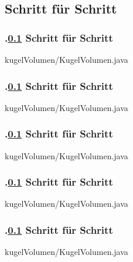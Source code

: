 \def\stitle{Schritt f\"ur Schritt}%
\subsection{\stitle}\label{S:Schritt f\"ur Schritt}
\begin{frame}[t]%
  \frametitle{\kap.\ref{S:Schritt f\"ur Schritt} \stitle}%
\medskip


{kugelVolumen/KugelVolumen.java}

\end{frame}


\def\stitle{Schritt f\"ur Schritt}%
\begin{frame}[t]%
  \frametitle{\kap.\ref{S:Schritt f\"ur Schritt} \stitle}%
\medskip


{kugelVolumen/KugelVolumen.java}

\end{frame}


\def\stitle{Schritt f\"ur Schritt}%
\begin{frame}[t]%
  \frametitle{\kap.\ref{S:Schritt f\"ur Schritt} \stitle}%
\medskip


{kugelVolumen/KugelVolumen.java}

\end{frame}


\def\stitle{Schritt f\"ur Schritt}%
\begin{frame}[t]%
  \frametitle{\kap.\ref{S:Schritt f\"ur Schritt} \stitle}%
\medskip


{kugelVolumen/KugelVolumen.java}

\end{frame}


\def\stitle{Schritt f\"ur Schritt}%
\begin{frame}[t]%
  \frametitle{\kap.\ref{S:Schritt f\"ur Schritt} \stitle}%
\medskip


{kugelVolumen/KugelVolumen.java}

\end{frame}



